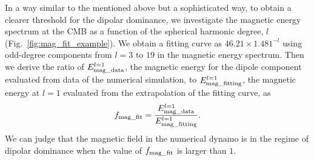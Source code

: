 In a way similar to the mentioned above but a sophisticated way, to obtain a clearer threshold for the dipolar dominance, we investigate the magnetic energy spectrum at the CMB as a function of the spherical harmonic degree, $l$ (Fig.~\ref{fig:mag_fit_example}).
We obtain a fitting curve as $46.21 \times 1.481^{-l}$ using odd-degree components from $l = 3$ to $19$ in the magnetic energy spectrum.
Then we derive the ratio of $E_{\rm mag\_data}^{l=1}$, the magnetic energy for the dipole component evaluated from data of the numerical simulation, to $E_{\rm mag\_fitting}^{l=1}$, the magnetic energy at $l=1$ evaluated from the extrapolation of the fitting curve, as 
%
\begin{equation}
f_{\rm mag\_fit} = \frac{E_{\rm mag\_data}^{l=1} }{E_{\rm mag\_fitting}^{l=1}} .
\label{eq:def_f_mag_fit}
\end{equation}
%
We can judge that the magnetic field in the numerical dynamo is in the regime of dipolar dominance when the value of $f_{\rm mag\_fit}$ is larger than $1$.

